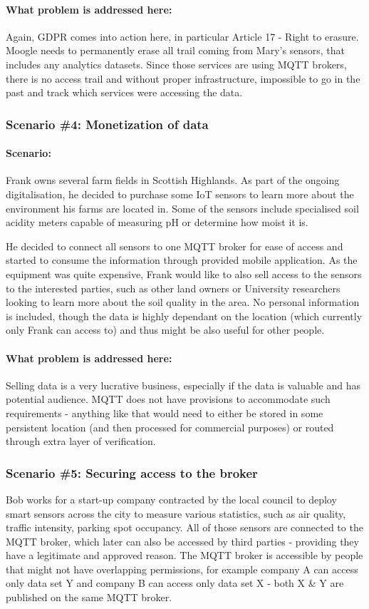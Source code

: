 \paragraph{\textbf{What problem is addressed here:}}
Again, GDPR comes into action here, in particular Article 17 - Right to erasure. Moogle needs to permanently erase all trail coming from Mary's sensors, that includes any analytics datasets. Since those services are using MQTT brokers, there is no access trail and without proper infrastructure, impossible to go in the past and track which services were accessing the data.
\\
\subsubsection{Scenario \#4: Monetization of data}
\paragraph{\textbf{Scenario:}}
Frank owns several farm fields in Scottish Highlands. As part of the ongoing digitalisation, he decided to purchase some IoT sensors to learn more about the environment his farms are located in. Some of the sensors include specialised soil acidity meters capable of measuring pH or determine how moist it is.

He decided to connect all sensors to one MQTT broker for ease of access and started to consume the information through provided mobile application. As the equipment was quite expensive, Frank would like to also sell access to the sensors to the interested parties, such as other land owners or University researchers looking to learn more about the soil quality in the area. No personal information is included, though the data is highly dependant on the location (which currently only Frank can access to) and thus might be also useful for other people. 
\paragraph{\textbf{What problem is addressed here:}}
Selling data is a very lucrative business, especially if the data is valuable and has potential audience. MQTT does not have provisions to accommodate such requirements - anything like that would need to either be stored in some persistent location (and then processed for commercial purposes) or routed through extra layer of verification.
\\
\subsubsection{Scenario \#5: Securing access to the broker}
Bob works for a start-up company contracted by the local council to deploy smart sensors across the city to measure various statistics, such as air quality, traffic intensity, parking spot occupancy. All of those sensors are connected to the MQTT broker, which later can also be accessed by third parties - providing they have a legitimate and approved reason. The MQTT broker is accessible by people that might not have overlapping permissions, for example company A can access only data set Y and company B can access only data set X - both X \& Y are published on the same MQTT broker.

